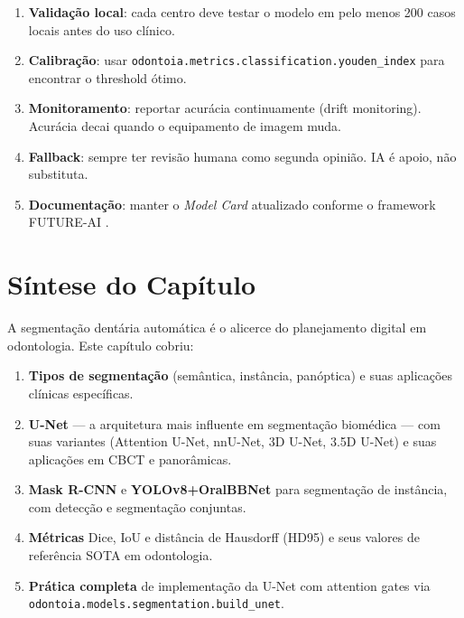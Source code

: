 \begin{enumerate}
    \item \textbf{Validação local}: cada centro deve testar o modelo
    em pelo menos 200 casos locais antes do uso clínico.
    \item \textbf{Calibração}: usar \texttt{odontoia.metrics.classification.youden\_index}
    para encontrar o threshold ótimo.
    \item \textbf{Monitoramento}: reportar acurácia continuamente
    (drift monitoring). Acurácia decai quando o equipamento de
    imagem muda.
    \item \textbf{Fallback}: sempre ter revisão humana como
    segunda opinião. IA é apoio, não substituta.
    \item \textbf{Documentação}: manter o \emph{Model Card} atualizado
    conforme o framework FUTURE-AI \cite{futureai2025}.
\end{enumerate}



\section{Síntese do Capítulo}
\label{sec:sintese-08}

A segmentação dentária automática é o alicerce do planejamento digital em
odontologia. Este capítulo cobriu:

\begin{enumerate}
  \item \textbf{Tipos de segmentação} (semântica, instância, panóptica) e
        suas aplicações clínicas específicas.
  \item \textbf{U-Net} --- a arquitetura mais influente em segmentação
        biomédica --- com suas variantes (Attention U-Net, nnU-Net, 3D U-Net,
        3.5D U-Net) e suas aplicações em CBCT e panorâmicas.
  \item \textbf{Mask R-CNN} e \textbf{YOLOv8+OralBBNet} para segmentação de
        instância, com detecção e segmentação conjuntas.
  \item \textbf{Métricas} Dice, IoU e distância de Hausdorff (HD95) e seus
        valores de referência SOTA em odontologia.
  \item \textbf{Prática completa} de implementação da U-Net com attention
        gates via \texttt{odontoia.models.segmentation.build\_unet}.
\end{enumerate}

